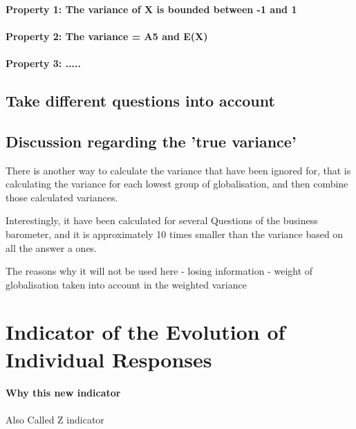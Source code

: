 \documentclass[12pt,a4paper,oneside]{book}
\begin{document}
\subsubsection{Property 1: The variance of X is bounded between -1 and 1}

\subsubsection{Property 2: The variance = A5 and E(X)}


\subsubsection{Property 3: .....}


\section{Take different questions into account}





\section{Discussion regarding the 'true variance'}

There is another way to calculate the variance that have been ignored for, that is calculating the variance for each lowest group of globalisation, and then combine those calculated variances.


Interestingly, it have been calculated for several Questions of the business barometer, and it is approximately 10 times smaller than the variance based on all the answer a ones.



The reasons why it will not be used here
- losing information
- weight of globalisation taken into account in the weighted variance




\chapter{Indicator of the Evolution of Individual Responses}

 \subsubsection{Why this new indicator}

Also Called Z indicator
\end{document}
